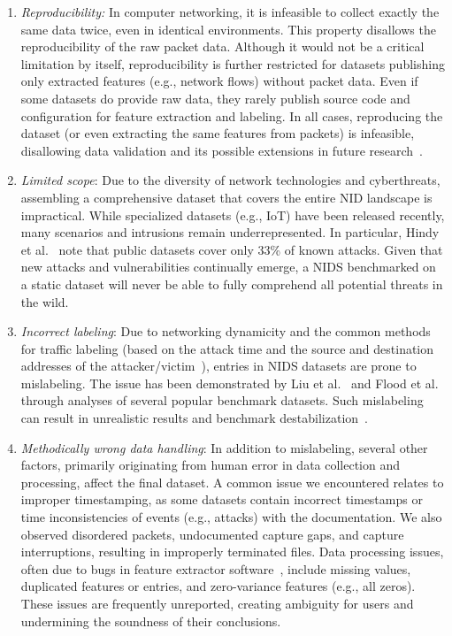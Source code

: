 \begin{enumerate}[wide, label={\arabic*)}, topsep=0pt, itemindent=\parindent, itemsep=0pt, parsep=0pt, partopsep=0pt]
\item \emph{Reproducibility:} In computer networking, it is infeasible to collect exactly the same data twice, even in identical environments. This property disallows the reproducibility of the raw packet data. Although it would not be a critical limitation by itself, reproducibility is further restricted for datasets publishing only extracted features (e.g., network flows) without packet data. Even if some datasets do provide raw data, they rarely publish source code and configuration for feature extraction and labeling. In all cases, reproducing the dataset (or even extracting the same features from packets) is infeasible, disallowing data validation and its possible extensions in future research~\cite{landauer2023_ait_ldsv2_dataset}.

\item \emph{Limited scope}: Due to the diversity of network technologies and cyberthreats, assembling a comprehensive dataset that covers the entire NID landscape is impractical. While specialized datasets (e.g., IoT) have been released recently, many scenarios and intrusions remain underrepresented. In particular, Hindy et al.~\cite{hindy2020_network_threats_taxonomy} note that public datasets cover only 33\% of known attacks. Given that new attacks and vulnerabilities continually emerge, a NIDS benchmarked on a static dataset will never be able to fully comprehend all potential threats in the wild.

\item \emph{Incorrect labeling}: Due to networking dynamicity and the common methods for traffic labeling (based on the attack time and the source and destination addresses of the attacker/victim~\cite{guerra2022_datasets_labeling}), entries in NIDS datasets are prone to mislabeling. The issue has been demonstrated by Liu et al.~\cite{liu2022_error_prevalence_nids_data} and Flood et al.~\cite{flood2024_bad_design_smells_nids_datasets} through analyses of several popular benchmark datasets. Such mislabeling can result in unrealistic results and benchmark destabilization~\cite{northcutt2021_pervasive_label_errors}.

\item \emph{Methodically wrong data handling}: In addition to mislabeling, several other factors, primarily originating from human error in data collection and processing, affect the final dataset. A common issue we encountered relates to improper timestamping, as some datasets contain incorrect timestamps or time inconsistencies of events (e.g., attacks) with the documentation. We also observed disordered packets, undocumented capture gaps, and capture interruptions, resulting in improperly terminated files. Data processing issues, often due to bugs in feature extractor software~\cite{catillo2023_ml_public_ids_datasets}, include missing values, duplicated features or entries, and zero-variance features (e.g., all zeros). These issues are frequently unreported, creating ambiguity for users and undermining the soundness of their conclusions.
\end{enumerate}

